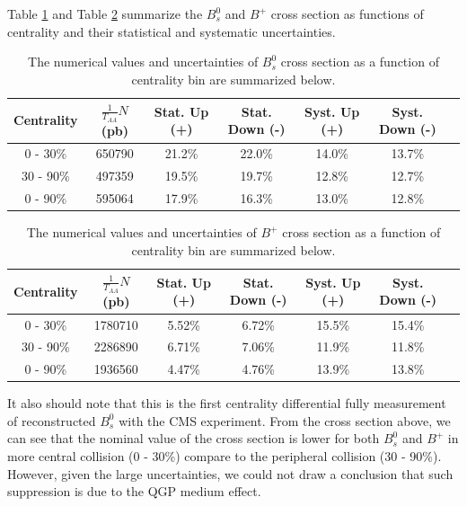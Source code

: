 Table \ref{BsXsectCent} and Table \ref{BPXsectCent} summarize the $B^0_s$ and $B^+$ cross section as functions of centrality and their statistical and systematic uncertainties.




\begin{table}[h]
\begin{center}
\caption{The numerical values and uncertainties of $B^0_s$ cross section as a function of centrality bin are summarized below.}
\vspace{1em}
\label{BsXsectCent}
  \begin{tabular}{| c | c |c | c| c| c| c|}
    \hline
Centrality &  $\frac{1}{T_{AA}} N$ (pb) & Stat. Up (+)   & Stat. Down (-)  &  Syst. Up (+)  &  Syst. Down (-) \\
    \hline
    \hline
0 - 30\% &   650790  &  21.2\% & 22.0\% & 14.0\% & 13.7\% \\ 
30 - 90\%  & 497359  & 19.5\%  & 19.7\%  & 12.8\% & 12.7\% \\ 
0 - 90\% &  595064 & 17.9\%   &  16.3\% & 13.0\% & 12.8\% \\ 
    \hline
    \hline
\end{tabular}
\end{center}
\end{table}


\begin{table}[h]
\begin{center}
\caption{The numerical values and uncertainties of $B^+$ cross section as a function of centrality bin are summarized below.}
\vspace{1em}
\label{BPXsectCent}
  \begin{tabular}{| c | c |c | c| c| c| c|}
    \hline
Centrality &  $\frac{1}{T_{AA}} N$ (pb) & Stat. Up (+)   & Stat. Down (-)  &  Syst. Up (+)  &  Syst. Down (-) \\
    \hline
    \hline
0 - 30\% &   1780710  &  5.52\% & 6.72\% & 15.5\% & 15.4\% \\ 
30 - 90\%  & 2286890  & 6.71\%  & 7.06\%  & 11.9\% & 11.8\% \\ 
0 - 90\% &  1936560 & 4.47\%   &  4.76\% & 13.9\% & 13.8\% \\ 
    \hline
    \hline
\end{tabular}
\end{center}
\end{table}



It also should note that this is the first centrality differential fully measurement of reconstructed $B^0_s$ with the CMS experiment. From the cross section above, we can see that the nominal value of the cross section is lower for both $B^0_s$ and $B^+$ in more central collision (0 - 30\%) compare to the peripheral collision (30 - 90\%). However, given the large uncertainties, we could not draw a conclusion that such suppression is due to the QGP medium effect.






